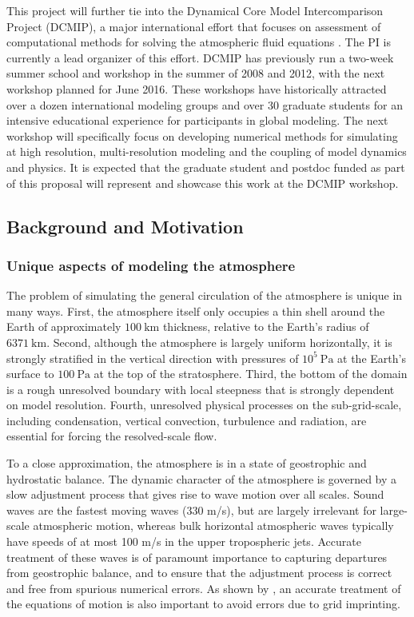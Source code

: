 \documentclass[11pt]{article}
\begin{document}
This project will further tie into the Dynamical Core Model Intercomparison Project (DCMIP), a major international effort that focuses on assessment of computational methods for solving the atmospheric fluid equations \cite{DCMIP2012TESTCASES,kent2013dynamical}.  The PI is currently a lead organizer of this effort.  DCMIP has previously run a two-week summer school and workshop in the summer of 2008 and 2012, with the next workshop planned for June 2016.  These workshops have historically attracted over a dozen international modeling groups and over 30 graduate students for an intensive educational experience for participants in global modeling.  The next workshop will specifically focus on developing numerical methods for simulating at high resolution, multi-resolution modeling and the coupling of model dynamics and physics.  It is expected that the graduate student and postdoc funded as part of this proposal will represent and showcase this work at the DCMIP workshop.

\subsection{Background and Motivation} \label{sec:BackgroundMotivation}

\subsubsection{Unique aspects of modeling the atmosphere} \label{sec:UniqueAtmosphere}

The problem of simulating the general circulation of the atmosphere is unique in many ways.  First, the atmosphere itself only occupies a thin shell around the Earth of approximately $100\ \mbox{km}$ thickness, relative to the Earth's radius of $6371\ \mbox{km}$.  Second, although the atmosphere is largely uniform horizontally, it is strongly stratified in the vertical direction with pressures of $10^5\ \mbox{Pa}$ at the Earth's surface to $100\ \mbox{Pa}$ at the top of the stratosphere.  Third, the bottom of the domain is a rough unresolved boundary with local steepness that is strongly dependent on model resolution.  Fourth, unresolved physical processes on the sub-grid-scale, including condensation, vertical convection, turbulence and radiation, are essential for forcing the resolved-scale flow.

To a close approximation, the atmosphere is in a state of geostrophic and hydrostatic balance.  The dynamic character of the atmosphere is governed by a slow adjustment process that gives rise to wave motion over all scales.  Sound waves are the fastest moving waves (330 m/s), but are largely irrelevant for large-scale atmospheric motion, whereas bulk horizontal atmospheric waves typically have speeds of at most 100 m/s in the upper tropospheric jets.  Accurate treatment of these waves is of paramount importance to capturing departures from geostrophic balance, and to ensure that the adjustment process is correct and free from spurious numerical errors.  As shown by \cite{PHLCJMATRDN2010JAMES}, an accurate treatment of the equations of motion is also important to avoid errors due to grid imprinting.  
\end{document}
